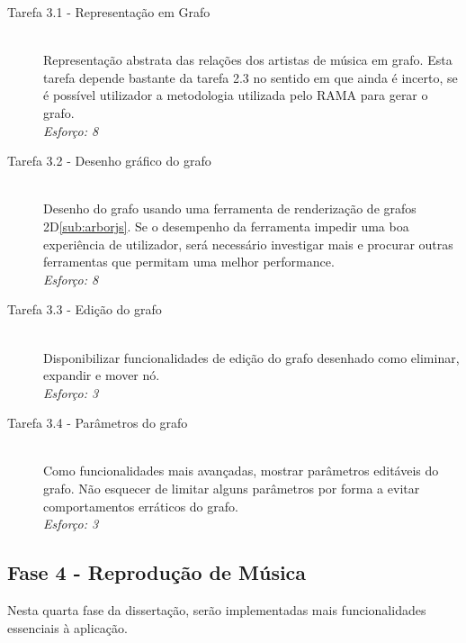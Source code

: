     \begin{description}
      \item[Tarefa 3.1 - Representação em Grafo] \hfill \\
      Representação abstrata das relações dos artistas de música em grafo.
      Esta tarefa depende bastante da tarefa 2.3 no sentido em que ainda é incerto, se é possível utilizador a metodologia utilizada pelo RAMA para gerar o grafo. \\
      \emph{Esforço: 8}

      \item[Tarefa 3.2 - Desenho gráfico do grafo] \hfill \\
      Desenho do grafo usando uma ferramenta de renderização de grafos 2D\ref{sub:arborjs}.
      Se o desempenho da ferramenta impedir uma boa experiência de utilizador, será necessário investigar mais e procurar outras ferramentas que permitam uma melhor performance. \\
      \emph{Esforço: 8}

      \item[Tarefa 3.3 - Edição do grafo] \hfill \\
      Disponibilizar funcionalidades de edição do grafo desenhado como eliminar, expandir e mover nó. \\
      \emph{Esforço: 3}

      \item[Tarefa 3.4 - Parâmetros do grafo] \hfill \\
      Como funcionalidades mais avançadas, mostrar parâmetros editáveis do grafo.
      Não esquecer de limitar alguns parâmetros por forma a evitar comportamentos erráticos do grafo.\\
      \emph{Esforço: 3}

    \end{description}


  \subsection{Fase 4 - Reprodução de Música} %
  \label{sub:dev_playlists}
  
    Nesta quarta fase da dissertação, serão implementadas mais funcionalidades essenciais à aplicação.

